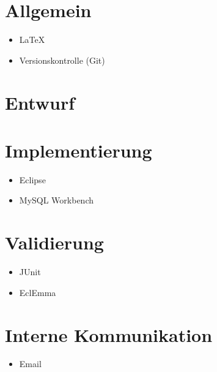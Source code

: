 
\section{Allgemein}
\begin{itemize}
	\item LaTeX
	\item Versionskontrolle (Git)
\end{itemize}
\section{Entwurf}
\begin{itemize}

\end{itemize}
\section{Implementierung}
\begin{itemize}
	\item Eclipse
	\item MySQL Workbench
\end{itemize}
\section{Validierung}
\begin{itemize}
	\item JUnit
	\item EclEmma
\end{itemize}
\section{Interne Kommunikation}
\begin{itemize}
	\item Email
\end{itemize}
